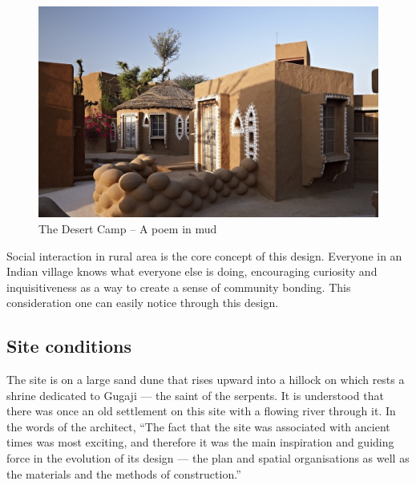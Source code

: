 \begin{figure}
  \centerline{\includegraphics[width=\paperwidth]{img/dc-01}}
  \caption{The Desert Camp -- A poem in mud}
  \label{fig:dc-01} 
\end{figure}


\noindent Social interaction in rural area is the core concept of this design. Everyone in an Indian village knows what everyone else is doing, encouraging curiosity and inquisitiveness as a way to create a sense of community bonding. This consideration one can easily notice through this design.


\subsection{Site conditions} %
\label{sub:dcm_sitecond}

The site is on a large sand dune that rises upward into a hillock on which rests a shrine dedicated to Gugaji --- the saint of the serpents. It is understood that there was once an old settlement on this site with a flowing river through it. In the words of the architect, ``The fact that the site was associated with ancient times was most exciting, and therefore it was the main inspiration and guiding force in the evolution of its design --- the plan and spatial organisations as well as the materials and the methods of construction.''


